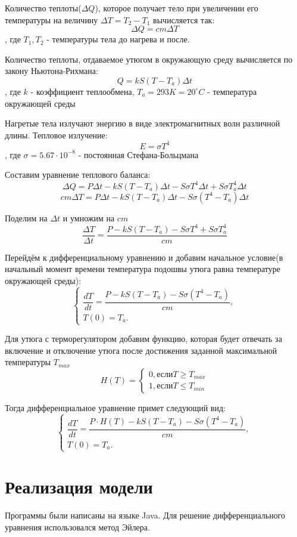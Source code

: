 \documentclass[a4paper, 14pt]{extarticle}
\begin{document}
		Количество теплоты(\(\Delta Q\)), которое получает тело при увеличении его температуры на величину 
		\( \Delta T = T_2 - T_1 \) вычисляется так:
		\[ \Delta Q = cm \Delta T \], где \( T_1, T_2\) - температуры тела до нагрева и после.
		
		Количество теплоты, отдаваемое утюгом в окружающую среду вычисляется по закону Ньютона-Рихмана:
		\[ Q = kS(T-T_a) \Delta t \]
		, где \(k\) - коэффициент теплообмена, $T_a = 293K = 20^{\circ}C$ - температура окружающей среды
			
		Нагретые тела излучают энергию в виде электромагнитных волн различной длины. Тепловое излучение:
		\[ E = \sigma T^4 \]
		, где \( \sigma = 5.67 \cdot 10^{-8} \) - постоянная Стефана-Больцмана
		
		Составим уравнение теплового баланса:
		\[ \Delta Q = P\Delta t - kS(T-T_a) \Delta t - S \sigma T^4 \Delta t +  S \sigma T_a^4 \Delta t\]
		\[ cm \Delta T = P\Delta t - kS(T-T_a) \Delta t - S \sigma (T^4 - T_a) \Delta t \]
		
		Поделим на \( \Delta t\) и умножим на \(cm\)
		\[ \dfrac{\Delta T}{\Delta t} 
		= \dfrac{P - kS(T-T_a) - S \sigma T^4 +  S \sigma T_a^4}{cm}\]
		
		Перейдём к дифференциальному уравнению и добавим начальное условие(в начальный момент времени
		температура подошвы утюга равна температуре окружающей среды):
		\[
			\begin{cases}
				\dfrac{dT}{dt} = \dfrac{P - kS(T-T_a) - S \sigma (T^4 - T_a)}{cm},\\
				T(0) = T_a.
			\end{cases} \tag{1} \label{eq:1}
		\]
		
		Для утюга с терморегулятором добавим функцию, которая будет отвечать за включение и отключение утюга
		после достижения заданной максимальной температуры $T_{max}$
		\[ H(T) = 
			\begin{cases}
				0, \text{если} T \geq T_{max}\\
				1, \text{если} T \leq T_{min}
			\end{cases} 
		\]
		
		Тогда дифференциальное уравнение примет следующий вид:
		\[
		\begin{cases}
			\dfrac{dT}{dt} = \dfrac{ P\cdot H(T) - kS(T-T_a) - S \sigma (T^4 - T_a)}{cm},\\
			T(0) = T_a.
		\end{cases} \tag{2} \label{eq:2}
		\]
	
	\section{Реализация модели}
		\setlength\parindent{0pt}
		Программы были написаны на языке Java. Для решение дифференциального уравнения
		использовался метод Эйлера.
\end{document}
